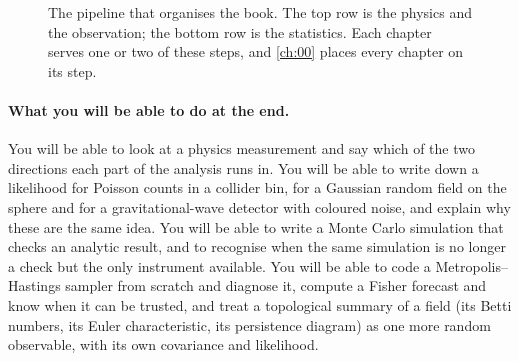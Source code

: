 \begin{figure}[htbp]
\centering
{}
\caption{The pipeline that organises the book. The top row is the physics
and the observation; the bottom row is the statistics. Each chapter serves
one or two of these steps, and \cref{ch:00} places every chapter on its step.}
\label{pre:fig:pipeline}
\end{figure}

\paragraph{What you will be able to do at the end.}
You will be able to look at a physics measurement and say which of the two
directions each part of the analysis runs in. You will be able to write down
a likelihood for Poisson counts in a collider bin, for a Gaussian random field
on the sphere and for a gravitational-wave detector with coloured noise, and
explain why these are the same idea. You will be able to write a Monte Carlo
simulation that checks an analytic result, and to recognise when the same
simulation is no longer a check but the only instrument available. You will
be able to code a Metropolis--Hastings sampler from scratch and diagnose it,
compute a Fisher forecast and know when it can be trusted, and treat a
topological summary of a field (its Betti numbers, its Euler characteristic,
its persistence diagram) as one more random observable, with its own
covariance and likelihood.

